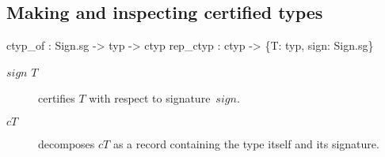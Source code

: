 \subsection{Making and inspecting certified types}
\begin{ttbox} 
ctyp_of  : Sign.sg -> typ -> ctyp
rep_ctyp : ctyp -> \{T: typ, sign: Sign.sg\}
\end{ttbox}
\begin{description}
\item[ $sign$ $T$] 
certifies $T$ with respect to signature~$sign$.

\item[ $cT$] 
decomposes $cT$ as a record containing the type itself and its signature.
\end{description}

